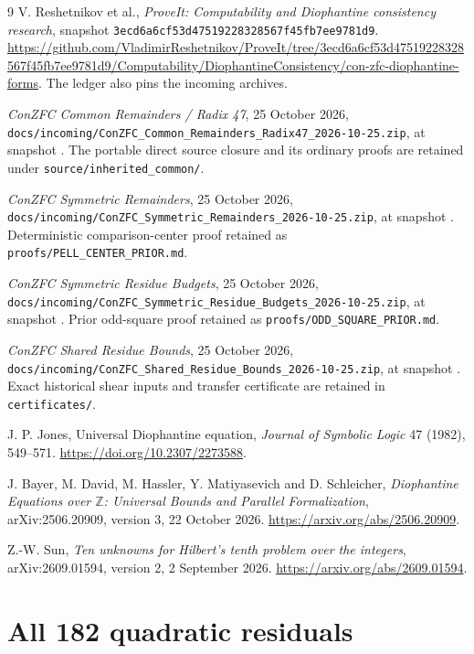 \documentclass[11pt,letterpaper]{article}
\newcommand{\ZZ}{\mathbb Z}
\newcommand{\file}[1]{\texttt{\nolinkurl{#1}}}
\begin{document}
\begin{thebibliography}{9}
V. Reshetnikov et al.,
\emph{ProveIt: Computability and Diophantine consistency research},
snapshot \file{3ecd6a6cf53d47519228328567f45fb7ee9781d9}.
\url{https://github.com/VladimirReshetnikov/ProveIt/tree/3ecd6a6cf53d47519228328567f45fb7ee9781d9/Computability/DiophantineConsistency/con-zfc-diophantine-forms}.
The ledger also pins the incoming archives.

\emph{ConZFC Common Remainders / Radix 47}, 25 October 2026,
\file{docs/incoming/ConZFC_Common_Remainders_Radix47_2026-10-25.zip},
at snapshot \cite{repo}. The portable direct source closure and its
ordinary proofs are retained under \file{source/inherited_common/}.

\emph{ConZFC Symmetric Remainders}, 25 October 2026,
\file{docs/incoming/ConZFC_Symmetric_Remainders_2026-10-25.zip},
at snapshot \cite{repo}. Deterministic comparison-center proof
retained as \file{proofs/PELL_CENTER_PRIOR.md}.

\emph{ConZFC Symmetric Residue Budgets}, 25 October 2026,
\file{docs/incoming/ConZFC_Symmetric_Residue_Budgets_2026-10-25.zip},
at snapshot \cite{repo}. Prior odd-square proof retained as
\file{proofs/ODD_SQUARE_PRIOR.md}.

\emph{ConZFC Shared Residue Bounds}, 25 October 2026,
\file{docs/incoming/ConZFC_Shared_Residue_Bounds_2026-10-25.zip},
at snapshot \cite{repo}. Exact historical shear inputs and transfer
certificate are retained in \file{certificates/}.

J. P. Jones, Universal Diophantine equation,
\emph{Journal of Symbolic Logic} 47 (1982), 549--571.
\url{https://doi.org/10.2307/2273588}.

J. Bayer, M. David, M. Hassler, Y. Matiyasevich and D. Schleicher,
\emph{Diophantine Equations over $\ZZ$: Universal Bounds and
Parallel Formalization}, arXiv:2506.20909, version 3, 22 October 2026.
\url{https://arxiv.org/abs/2506.20909}.

Z.-W. Sun, \emph{Ten unknowns for Hilbert's tenth problem over the integers},
arXiv:2609.01594, version 2, 2 September 2026.
\url{https://arxiv.org/abs/2609.01594}.
\end{thebibliography}

\clearpage
\appendix
\section{All 182 quadratic residuals}\label{app:rows}
\end{document}
